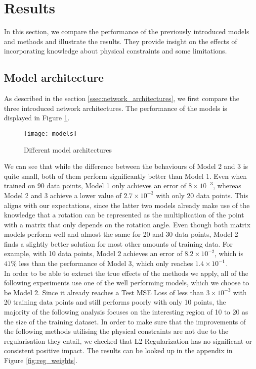\label{section:results}
\section{Results}

In this section, we compare the performance of the previously introduced models and methods and illustrate the results. They provide insight on the effects of incorporating knowledge about physical constraints and some limitations.

\subsection{Model architecture}
As described in the section \ref{ssec:network_architectures}, we first compare the three introduced network architectures. The performance of the models is displayed in Figure \ref{fig:models}.
\begin{figure}[ht]
	\texttt{[image: models]}
	\caption{Different model architectures}
	\label{fig:models}
\end{figure}
We can see that while the difference between the behaviours of Model 2 and 3 is quite small, both of them perform significantly better than Model 1. Even when trained on 90 data points, Model 1 only achieves an error of $8\times 10^{-3}$, whereas Model 2 and 3 achieve a lower value of $2.7\times 10^{-3}$ with only 20 data points. This aligns with our expectations, since the latter two models already make use of the knowledge that a rotation can be represented as the multiplication of the point with a matrix that only depends on the rotation angle. Even though both matrix models perform well and almost the same for 20 and 30 data points, Model 2 finds a slightly better solution for most other amounts of training data. For example, with 10 data points, Model 2 achieves an error of $8.2\times 10^{-2}$, which is $41\%$ less than the performance of Model 3, which only reaches $1.4\times 10^{-1}$.\\
\indent In order to be able to extract the true effects of the methods we apply, all of the following experiments use one of the well performing models, which we choose to be Model 2. Since it already reaches a Test MSE Loss of less than $3\times10^{-3}$ with 20 training data points and still performs poorly with only 10 points, the majority of the following analysis focuses on the interesting region of 10 to 20 as the size of the training dataset. In order to make sure that the improvements of the following methods utilising the physical constraints are not due to the regularisation they entail, we checked that L2-Regularization has no significant or consistent positive impact. The results can be looked up in the appendix in Figure \ref{fig:reg_weights}.

